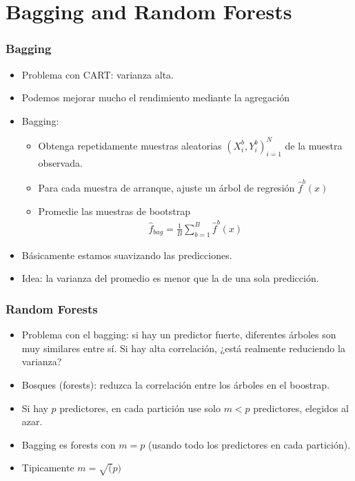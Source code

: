 \documentclass[
  shownotes,
  xcolor={svgnames},
  hyperref={colorlinks,citecolor=DarkBlue,linkcolor=DarkRed,urlcolor=DarkBlue}
  , aspectratio=169]{beamer}
\begin{document}
\section{Bagging and Random Forests }
\begin{frame}[fragile]
\frametitle{Bagging}

\begin{itemize}
  \item Problema con CART: varianza alta.
   \item Podemos mejorar mucho el rendimiento mediante la agregación 
   \item Bagging:
    \begin{itemize}
       \item Obtenga repetidamente muestras aleatorias $(X_i^b,Y_i^b)_{i=1}^N$ de la muestra observada.
       \item Para cada muestra de arranque, ajuste un árbol de regresión $\hat{f}^b(x)$
       \item Promedie las muestras de bootstrap 
        \begin{align}
         \hat{f}_{bag} =\frac{1}{B}\sum_{b=1}^B \hat{f}^b(x)
        \end{align}
      \end{itemize}
  \item Básicamente estamos suavizando las predicciones.
  \item Idea: la varianza del promedio es menor que la de una sola predicción.
  \end{itemize}

\end{frame}

\begin{frame}[fragile]
\frametitle{Random Forests}

\begin{itemize}
  \item Problema con el bagging: si hay un predictor fuerte, diferentes árboles son muy similares entre sí. Si hay alta correlación, ¿está realmente reduciendo la varianza?
\bigskip
\item Bosques (forests): reduzca la correlación entre los árboles  en el boostrap.
\bigskip
\item Si hay $p$ predictores, en cada partición use solo  $m <p$ predictores, elegidos al azar.
\bigskip
\item Bagging es forests con $m = p$ (usando todo los predictores en cada partición).
\bigskip
\item Tipicamente $m = \sqrt(p)$
\end{itemize}

\end{frame}
\end{document}

